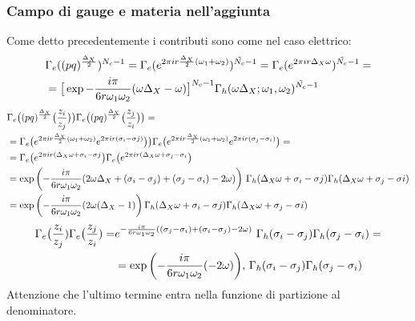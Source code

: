 \documentclass[a4paper,12pt]{article}
\begin{document}
\subsubsection*{Campo di gauge e materia nell'aggiunta}
Come detto precedentemente i contributi sono come nel caso elettrico:
\begin{align*}
& \Gamma_e((pq)^{\frac{\Delta_X}{2}})^{N_c -1} =
\Gamma_e( e^{2 \pi i r  {\Delta_X \over 2} (\omega_1 + \omega_2)})^{\tilde{N_c}-1} =  \Gamma_e( e^{2 \pi i r  \Delta_X \omega })^{\tilde{N_c}-1} = \\
&=\big[ \exp{- \frac{i \pi} {6 r \omega_1 \omega_2 }  ( \omega \Delta_X - \omega) }\big]^{N_c-1} \Gamma_h ( \omega \Delta_X ; \omega_1, \omega_2)^{\tilde{N_c}-1}
\end{align*}
 \begin{align*}
 & \Gamma_e\big( (pq)^{\frac{\Delta_X}{2}} \big( { z_i \over z_j} \big) \big) \Gamma_e \big( (pq)^{\frac{\Delta_X}{2}} \big( { z_j \over z_i} \big) \big) = \\
&= \Gamma_e\big( e^{2 \pi i r \frac{\Delta_X}{2} (\omega_1 + \omega_2)} e^{ 2 \pi  i r (\sigma_i - \sigma j)} \big) \big) \Gamma_e \big( e^{ 2 \pi i r \frac{\Delta_X}{2} (\omega_1 + \omega_2)}  e^{ 2 \pi i r (\sigma_j - \sigma_i)} \big) =  \\
&= \Gamma_e\big( e^{2 \pi  i r (\Delta_X \omega +\sigma_i - \sigma j} \big) \Gamma_e \big(  e^{2 \pi  i r (\Delta_X \omega +\sigma_j - \sigma_i} \big) \\
 & = \exp \bigg( {- \frac{i \pi} {6 r \omega_1 \omega_2 }  ( 2 \omega \Delta_X + (\sigma_i - \sigma_j)+(\sigma_j - \sigma_i) - 2 \omega) }\bigg)\, \, \Gamma_h ( \Delta_X \omega + \sigma_i - \sigma j ) \Gamma_h ( \Delta_X \omega + \sigma_j - \sigma i) \\
 & = \exp\bigg({- \frac{i \pi} {6 r \omega_1 \omega_2 }  ( 2 \omega (\Delta_X - 1) }\bigg)  \, \Gamma_h ( \Delta_X \omega + \sigma_i - \sigma j ) \Gamma_h ( \Delta_X \omega + \sigma_j - \sigma i) 
\end{align*}
\begin{align*}
  \Gamma_e\big( {z_i \over z_j})\Gamma_e\big( {z_j \over z_i}) = &e^{- \frac{i \pi} {6 r \omega_1 \omega_2 }  ( (\sigma_j - \sigma_i) + (\sigma_i- \sigma_j) - 2 \omega)} \, \, \Gamma_h (  \sigma_i - \sigma_j) \Gamma_h (  \sigma_j - \sigma_i) =\\
& = \exp \bigg( {- \frac{i \pi} {6 r \omega_1 \omega_2 }  ( - 2 \omega)}  \bigg) , \, \Gamma_h (  \sigma_i - \sigma_j) \Gamma_h (  \sigma_j - \sigma_i)
\end{align*}
Attenzione che l'ultimo termine entra nella funzione di partizione al denominatore.\\
\end{document}
